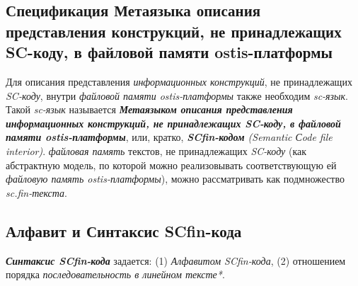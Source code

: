 \subsection{Спецификация Метаязыка описания представления конструкций, не принадлежащих SC-коду, в файловой памяти ostis-платформы}
\label{sec_soft_platform_scfin_code}

Для описания представления \textit{информационных конструкций}, не принадлежащих \textit{SC-коду}, внутри \textit{файловой памяти ostis-платформы} также необходим \textit{sc-язык}. Такой \textit{sc-язык} называется \textbf{\textit{Метаязыком описания представления информационных конструкций, не принадлежащих SC-коду, в файловой памяти ostis-платформы}}, или, кратко, \textit{\textbf{SCfin-кодом} (Semantic Сode file interior)}. \textit{файловая память} текстов, не принадлежащих \textit{SC-коду} (как абстрактную модель, по которой можно реализовывать соответствующую ей \textit{файловую память ostis-платформы}), можно рассматривать как подмножество \textit{sc.fin-текста}.

\begin{SCn}
\begin{scnindent}
\end{scnindent}
\end{SCn}

\subsection{Алфавит и Синтаксис SCfin-кода}
\label{sec_soft_platform_scfin_code_alphabet_and_syntax}

\textbf{\textit{Синтаксис SCfin-кода}} задается: (1) \textit{Алфавитом SCfin-кода}, (2) отношением порядка \textit{последовательность в линейном тексте*}.

\begin{SCn}
\begin{scneqtoset}
\end{scneqtoset}
\end{SCn}

